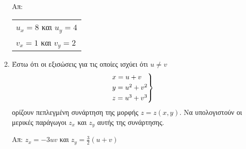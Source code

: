 \begin{enumerate}
    \hfill Απ: \begin{tabular}{l}
      $ u_{x} = 8 $ και $ u_{y} = 4 $ \\
      $ v_{x} = 1 $ και $ v_{y} = 2 $
    \end{tabular} 

  \item Έστω ότι οι εξισώσεις για τις οποίες ισχύει ότι $ u \neq v $
    \[
      \begin{rcases}
        x=u+v \\
        y=u^{2}+v^{2} \\
        z=u^{3}+v^{3}
      \end{rcases}
    \] 
    ορίζουν πεπλεγμένη συνάρτηση της μορφής $ z = z(x,y) $. Να υπολογιστούν οι 
    μερικές παράγωγοι $ z_{x} $ και $ z_{y} $ αυτής της συνάρτησης.

    \hfill Απ: $ z_{x} = -3uv $ και $ z_{y} = \frac{3}{2} (u+v) $  
\end{enumerate}





